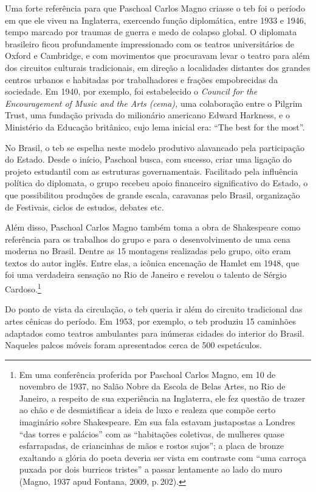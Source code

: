 Uma forte referência para que Paschoal Carlos Magno criasse o {\sc teb} foi o
período em que ele viveu na Inglaterra, exercendo função diplomática,
entre 1933 e 1946, tempo marcado por traumas de guerra e medo de colapso
global. O diplomata brasileiro ficou profundamente impressionado com os
teatros universitários de Oxford e Cambridge, e com movimentos que
procuravam levar o teatro para além dos circuitos culturais
tradicionais, em direção a localidades distantes dos grandes centros
urbanos e habitadas por trabalhadores e frações empobrecidas da
sociedade. Em 1940, por exemplo, foi estabelecido o {\it Council for the
Encouragement of Music and the Arts ({\sc cema}),} uma colaboração entre o
Pilgrim Trust, uma fundação privada do milionário americano Edward
Harkness, e o Ministério da Educação britânico, cujo lema inicial era:
“The best for the most”.

No Brasil, o {\sc teb} se espelha neste modelo produtivo alavancado pela
participação do Estado. Desde o início, Paschoal busca, com sucesso,
criar uma ligação do projeto estudantil com as estruturas
governamentais. Facilitado pela influência política do diplomata, o
grupo recebeu apoio financeiro significativo do Estado, o que
possibilitou produções de grande escala, caravanas pelo Brasil,
organização de Festivais, ciclos de estudos, debates etc.

Além disso, Paschoal Carlos Magno também toma a obra de Shakespeare como
referência para os trabalhos do grupo e para o desenvolvimento de uma
cena moderna no Brasil. Dentre as 15 montagens realizadas pelo grupo,
oito eram textos do autor inglês. Entre elas, a icônica encenação de
Hamlet em 1948, que foi uma verdadeira sensação no Rio de Janeiro e
revelou o talento de Sérgio Cardoso.\footnote{Em uma conferência
  proferida por Paschoal Carlos Magno, em 10 de novembro de 1937, no
  Salão Nobre da Escola de Belas Artes, no Rio de Janeiro, a respeito de
  sua experiência na Inglaterra, ele fez questão de trazer ao chão e de
  desmistificar a ideia de luxo e realeza que compõe certo imaginário
  sobre Shakespeare. Em sua fala estavam justapostas a Londres “das
  torres e palácios” com as “habitações coletivas, de mulheres quase
  esfarrapadas, de criancinhas de mãos e rostos sujos”; a placa de
  bronze exaltando a glória do poeta deveria ser vista em contraste com
  “uma carroça puxada por dois burricos tristes” a passar lentamente ao
  lado do muro (Magno, 1937 apud Fontana, 2009, p.\,202).}

Do ponto de vista da circulação, o {\sc teb} queria ir além do circuito
tradicional das artes cênicas do período. Em 1953, por exemplo, o {\sc teb}
produziu 15 caminhões adaptados como teatros ambulantes para inúmeras
cidades do interior do Brasil. Naqueles palcos móveis foram apresentados
cerca de 500 espetáculos.

